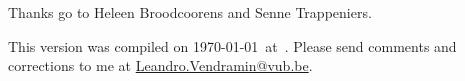 
 Thanks go to Heleen Broodcoorens and 
 Senne Trappeniers. 

This version 
was compiled on \today~at~\currenttime. 
Please send comments and corrections to me at \url{Leandro.Vendramin@vub.be}. 



